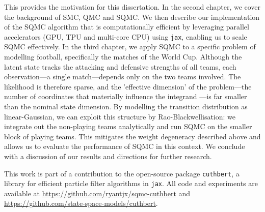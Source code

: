 This provides the motivation for this dissertation. In the second chapter, we cover the background of SMC, QMC and SQMC. We then describe our implementation of the SQMC algorithm that is computationally efficient by leveraging parallel accelerators (GPU, TPU and multi-core CPU) using \texttt{jax}, enabling us to scale SQMC effectively. In the third chapter, we apply SQMC to a specific problem of modelling football, specifically the matches of the World Cup. Although the latent state tracks the attacking and defensive strengths of all teams, each observation---a single match---depends only on the two teams involved. The likelihood is therefore sparse, and the 'effective dimension' of the problem---the number of coordinates that materially influence the integrand \citep{owen2003}---is far smaller than the nominal state dimension. By modelling the transition distribution as linear-Gaussian, we can exploit this structure by Rao-Blackwellisation: we integrate out the non-playing teams analytically and run SQMC on the smaller block of playing teams. This mitigates the weight degeneracy described above and allows us to evaluate the performance of SQMC in this context. We conclude with a discussion of our results and directions for further research.

This work is part of a contribution to the open-source package \texttt{cuthbert}, a library for efficient particle filter algorithms in \texttt{jax}. All code and experiments are available at \url{https://github.com/ryantjx/sqmc-cuthbert} and \url{https://github.com/state-space-models/cuthbert}.